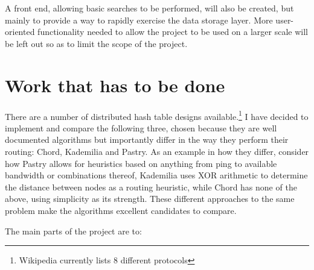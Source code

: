 A front end, allowing basic searches to be performed, will also be created, but mainly to provide a way to rapidly exercise the data storage layer. More user-oriented functionality needed to allow the project to be used on a larger scale will be left out so as to limit the scope of the project.

\section*{Work that has to be done}

There are a number of distributed hash table designs available.\footnote{ Wikipedia currently lists 8 different protocols } I have decided to implement and compare the following three, chosen because they are well documented algorithms but importantly differ in the way they perform their routing: Chord, Kademilia and Pastry. As an example in how they differ, consider how Pastry allows for heuristics based on anything from ping to available bandwidth or combinations thereof, Kademilia uses XOR arithmetic to determine the distance between nodes as a routing heuristic, while Chord has none of the above, using simplicity as its strength. These different approaches to the same problem make the algorithms excellent candidates to compare.

The main parts of the project are to:

